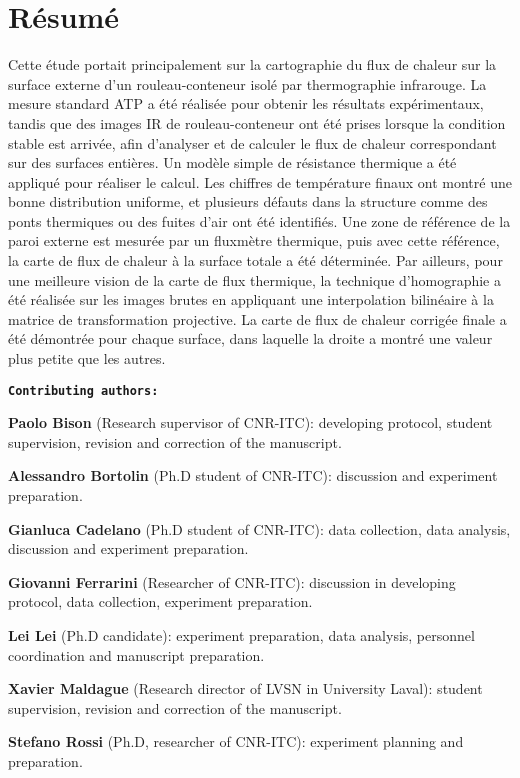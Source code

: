 \section*{Résumé}
Cette étude portait principalement sur la cartographie du flux de chaleur sur la surface externe d'un rouleau-conteneur isolé par thermographie infrarouge.
La mesure standard ATP a été réalisée pour obtenir les résultats expérimentaux, tandis que des images IR de rouleau-conteneur ont été prises lorsque la condition stable est arrivée, afin d'analyser et de calculer le flux de chaleur correspondant sur des surfaces entières. Un modèle simple de résistance thermique a été appliqué pour réaliser le calcul. Les chiffres de température finaux ont montré une bonne distribution uniforme, et plusieurs défauts dans la structure comme des ponts thermiques ou des fuites d'air ont été identifiés. Une zone de référence de la paroi externe est mesurée par un fluxmètre thermique, puis avec cette référence, la carte de flux de chaleur à la surface totale a été déterminée. Par ailleurs, pour une meilleure vision de la carte de flux thermique, la technique d'homographie a été réalisée sur les images brutes en appliquant une interpolation bilinéaire à la matrice de transformation projective. La carte de flux de chaleur corrigée finale a été démontrée pour chaque surface, dans laquelle la droite a montré une valeur plus petite que les autres.

\textbf{\texttt{Contributing authors:}}

\textbf{Paolo Bison} (Research supervisor of CNR-ITC): developing protocol, student supervision, revision and correction of the manuscript. 

\textbf{Alessandro Bortolin} (Ph.D student of CNR-ITC): discussion and experiment preparation.

\textbf{Gianluca Cadelano} (Ph.D student of CNR-ITC): data collection, data analysis, discussion and experiment preparation.

\textbf{Giovanni Ferrarini} (Researcher of CNR-ITC): discussion in developing protocol, data collection, experiment preparation.

\textbf{\textsf{Lei Lei}} (Ph.D candidate):  experiment preparation, data analysis,  personnel coordination and manuscript preparation.

\textbf{Xavier Maldague} (Research director of LVSN in University Laval): student supervision, revision and correction of the manuscript.

\textbf{Stefano Rossi} (Ph.D, researcher of CNR-ITC): experiment planning and preparation.



